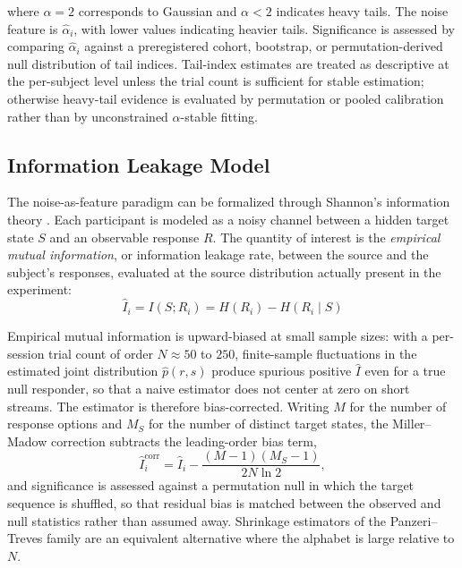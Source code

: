 \documentclass[11pt,letterpaper]{article}
\begin{document}
where $\alpha = 2$ corresponds to Gaussian and $\alpha < 2$ indicates heavy tails. The noise feature is $\hat{\alpha}_i$, with lower values indicating heavier tails. Significance is assessed by comparing $\hat{\alpha}_i$ against a preregistered cohort, bootstrap, or permutation-derived null distribution of tail indices. Tail-index estimates are treated as descriptive at the per-subject level unless the trial count is sufficient for stable estimation; otherwise heavy-tail evidence is evaluated by permutation or pooled calibration rather than by unconstrained $\alpha$-stable fitting.

\subsection{Information Leakage Model}

The noise-as-feature paradigm can be formalized through Shannon's information theory \cite{shannon1948,cover2006}. Each participant is modeled as a noisy channel between a hidden target state $S$ and an observable response $R$. The quantity of interest is the \textit{empirical mutual information}, or information leakage rate, between the source and the subject's responses, evaluated at the source distribution actually present in the experiment:
\begin{equation}
\hat{I}_i = I(S; R_i) = H(R_i) - H(R_i \mid S)
\label{eq:leakage}
\end{equation}

Empirical mutual information is upward-biased at small sample sizes: with a per-session trial count of order $N \approx 50$ to $250$, finite-sample fluctuations in the estimated joint distribution $\hat{p}(r,s)$ produce spurious positive $\hat{I}$ even for a true null responder, so that a naive estimator does not center at zero on short streams. The estimator is therefore bias-corrected. Writing $M$ for the number of response options and $M_S$ for the number of distinct target states, the Miller--Madow correction subtracts the leading-order bias term,
\begin{equation}
\hat{I}_i^{\text{corr}} = \hat{I}_i - \frac{(M-1)(M_S-1)}{2N \ln 2},
\label{eq:millermadow}
\end{equation}
and significance is assessed against a permutation null in which the target sequence is shuffled, so that residual bias is matched between the observed and null statistics rather than assumed away. Shrinkage estimators of the Panzeri--Treves family are an equivalent alternative where the alphabet is large relative to $N$.
\end{document}
